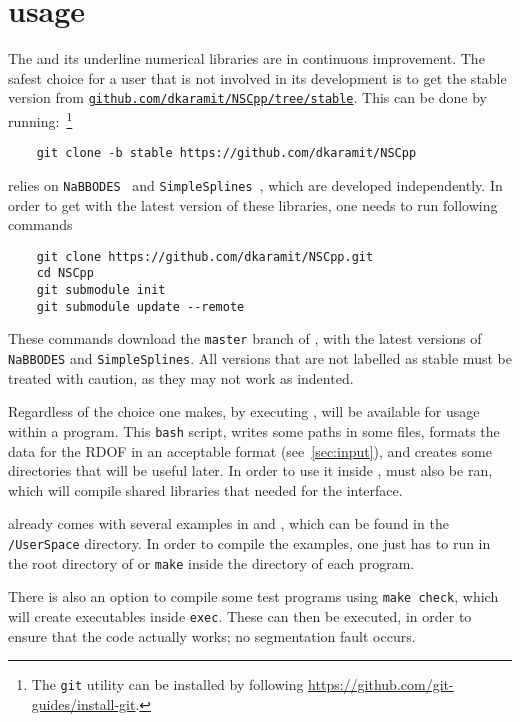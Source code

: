 \documentclass[11pt,a4paper]{article}
\begin{document}
\section{\nsc usage}\label{sec:first_steps}
\setcounter{equation}{0}
%
The \nsc and its underline numerical libraries are in continuous improvement. The safest choice for a user that is not involved in its development is to get the stable version from \href{https://github.com/dkaramit/NSCpp/tree/stable}{\tt github.com/dkaramit/NSCpp/tree/stable}. This can be done by running:~\footnote{The {\tt git} utility can be installed by following \href{https://github.com/git-guides/install-git}{https://github.com/git-guides/install-git}.}
%
\begin{lstlisting}
	git clone -b stable https://github.com/dkaramit/NSCpp
\end{lstlisting}

\nsc relies on {\tt NaBBODES}~\cite{NaBBODES} and {\tt SimpleSplines}~\cite{SimpleSplines}, which are developed independently. In order to get \nsc with the latest version of these libraries, one needs to run following commands
%
\begin{lstlisting}
	git clone https://github.com/dkaramit/NSCpp.git
	cd NSCpp
	git submodule init
	git submodule update --remote
\end{lstlisting}
%
These commands download the {\tt master} branch of \nsc, with the latest versions of {\tt NaBBODES} and {\tt SimpleSplines}. All versions that are not labelled as stable must be treated with caution, as they may not work as indented. 

Regardless of the choice one makes, by executing , \nsc will be available for usage within a \CPP program. This {\tt bash} script, writes some paths in some files, formats the data for the RDOF in an acceptable format (see~\ref{sec:input}), and creates some directories that will be useful later.
%
In order to use it inside \PY,  must also be ran,  which will compile shared libraries that needed for the \PY interface.

\nsc already comes with several examples in \CPP and \PY, which can be found in the {\tt \nsc/UserSpace} directory. In order to compile the \CPP examples, one just has to run   in the root directory of \nsc or {\tt make} inside the directory of each \CPP program.


There is also an option to compile some test programs using {\tt make check}, which will create executables inside {\tt exec}. These can then be executed, in order to ensure that the code actually works; \eg no segmentation fault occurs. 
\end{document}
